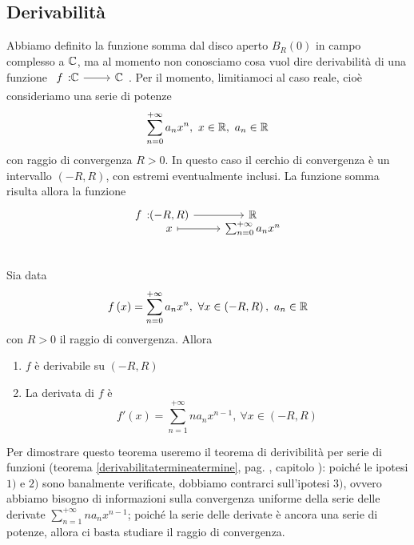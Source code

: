 \subsection{Derivabilità}
Abbiamo definito la funzione somma dal disco aperto $B_R\left(0\right)$ in campo complesso a $\mathbb{C}$, ma al momento non conosciamo cosa vuol dire derivabilità di una funzione $\funz{f}{\complexset}{\complexset}$. Per il momento, limitiamoci al caso reale, cioè consideriamo una serie di potenze
\begin{equation*}
	\sum_{n=0}^{+\infty}a_nx^n,\ x\in\realset,\ a_n\in\realset
\end{equation*}
con raggio di convergenza $R>0$. In questo caso il cerchio di convergenza è un intervallo $\left(-R,R\right)$, con estremi eventualmente inclusi. La funzione somma risulta allora la funzione
\begin{equation}
	\funztot{f}{\left(-R,R\right)}{\realset}{x}{\sum_{n=0}^{+\infty}a_nx^n}
\end{equation}
\begin{theorema}~{}\\
	Sia data
	\begin{equation*}
		f\left(x\right)=\sum_{n=0}^{+\infty}a_nx^n,\ \forall x\in\left(-R,R\right),\ a_n\in\realset
	\end{equation*}
con $R>0$ il raggio di convergenza. Allora
\begin{enumerate}
	\item $f$ è derivabile su $\left(-R,R\right)$
	\item La derivata di $f$ è
	\begin{equation}
		f'\left(x\right)=\sum_{n=1}^{+\infty}na_nx^{n-1},\ \forall x\in\left(-R,R\right)
	\end{equation}
\end{enumerate}
\end{theorema}
Per dimostrare questo teorema useremo il teorema di derivibilità per serie di funzioni (teorema \ref{derivabilitatermineatermine}, pag. \pageref{derivabilitatermineatermine}, capitolo ): poiché le ipotesi $1)$ e $2)$ sono banalmente verificate, dobbiamo contrarci sull'ipotesi $3)$, ovvero abbiamo bisogno di informazioni sulla convergenza uniforme della serie delle derivate $\displaystyle\sum_{n=1}^{+\infty}na_nx^{n-1}$; poiché la serie delle derivate è ancora una serie di potenze, allora ci basta studiare il raggio di convergenza.
